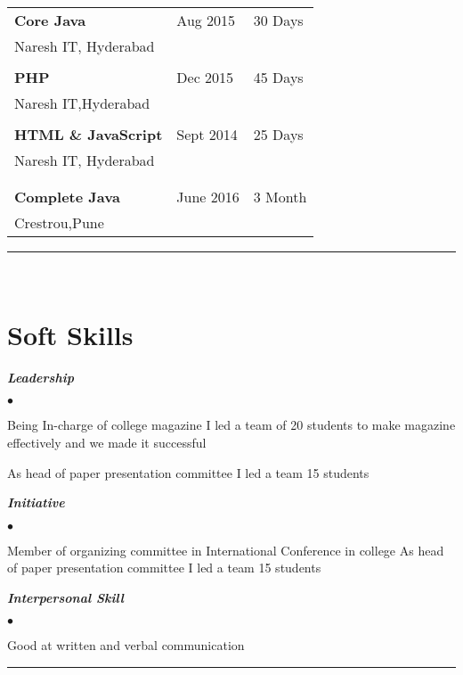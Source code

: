 \documentclass[letterpaper,margin,line]{RES}
\newenvironment{list2}{
  \begin{list}{$\bullet$}{%
      \setlength{\itemsep}{1pt}
      \setlength{\parsep}{0in} \setlength{\parskip}{0in}
      \setlength{\topsep}{0in} \setlength{\partopsep}{0in} 
      \setlength{\leftmargin}{0.2in}}}{\end{list}}
\def\mmmyline{\rule{\textwidth}{1pt}\\}
\begin{document}
\begin{resume}
\begin{tabular}{@{}p{4in}p{.75in}p{.75in}}
{\bf Core Java }          & Aug 2015 &   30 Days     \\
Naresh IT, Hyderabad                                &       & \\ \hline \\ 
{\bf  PHP }                                 & Dec 2015 &   45 Days   \\       
Naresh IT,Hyderabad  \it         &       &       
\\ \hline     \\
{\bf HTML \& JavaScript }                                      &  Sept  2014 &  25 Days    \\    
Naresh IT, Hyderabad \it                       &       &            \\
\\ \hline
\\
{\bf Complete Java }                                      &  June 2016 &  3 Month    \\    
Crestrou,Pune \it                        &       &            \\

\end{tabular}

\mmmyline

\section{\sc Soft Skills }



{\sl \bf Leadership } \hfill  \\
\begin{list2}		 
		 \item	Being In-charge of college magazine I led a team of 20 students to make magazine    effectively and we made it successful
		 	\item	As head of paper presentation committee I led a team 15 students
\end{list2}     

{\sl \bf Initiative } \hfill  \\
\begin{list2}		 
		 \item		Member of organizing committee in International Conference in college
		 	As head of paper presentation committee I led a team 15 students
\end{list2}  
       
       {\sl \bf Interpersonal Skill } \hfill  \\
\begin{list2}		 
		 \item		Good at written and verbal communication
\end{list2}
      \mmmyline
      


\end{resume}
\end{document}
